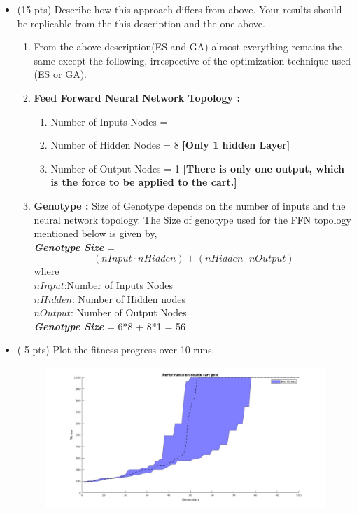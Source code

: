 \documentclass{article}
\begin{document}
\begin{itemize}
	\item (15 pts) Describe how this approach differs from above. Your results should be replicable from the this description and the one above.
\color{blue}
\begin{enumerate}
	\item From the above description(ES and GA) almost everything remains the same except the following, irrespective of the optimization technique used (ES or GA).
	\item \textbf{Feed Forward Neural Network Topology :}
	\begin{enumerate}
	\item Number of Inputs Nodes = \color{red}{6 = [Cart Position, Cart Velocity, Pole1 Position, Pole1 Angular Velocity, Pole2 Position, Pole2 Angular Velocity]} \color{blue}
	\item Number of Hidden Nodes = 8 \textbf{[Only 1 hidden Layer]}
	\item Number of Output Nodes = 1 \textbf{[There is only one output, which is the force to be applied to the cart.]}
	\end{enumerate}
	\item \textbf{Genotype :} Size of Genotype depends on the number of inputs and the neural network topology. The Size of genotype used for the FFN topology mentioned below is given by, \\
    \textit{\textbf{Genotype Size}} = $$(nInput \cdot nHidden) + (nHidden \cdot nOutput)$$ where \\$nInput$:Number of Inputs Nodes\\$nHidden$: Number of Hidden nodes\\$nOutput$: Number of Output Nodes\\
	\textbf{\textit{Genotype Size}} = 6*8 + 8*1 = 56
\end{enumerate}
\color{black}	
	\item ( 5 pts) Plot the fitness progress over 10 runs.
        \begin{figure}[htpb]
            \centering
            \includegraphics[width=1.0\linewidth]{ga_10exp_2pole.jpg}

\end{figure}
\end{itemize}
\end{document}
